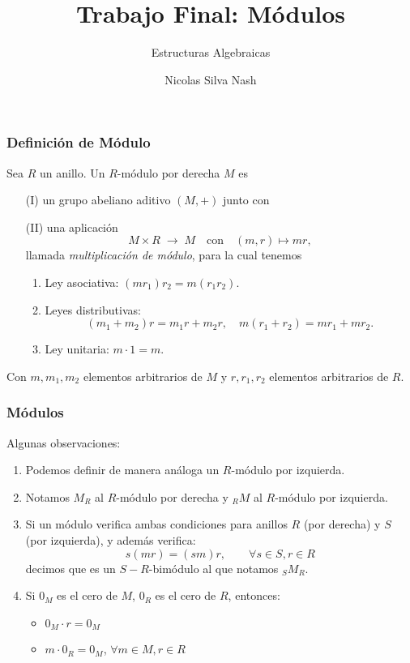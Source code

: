 \documentclass[notes=show]{beamer}%
\begin{document}
\title{Trabajo Final: Módulos}
\subtitle{Estructuras Algebraicas}
\author{Nicolas Silva Nash}
\date{}
\maketitle

\bigskip%
\begin{frame}
    \frametitle{Definición de Módulo}
    Sea \( R \) un anillo. Un \( R \)-módulo por derecha \( M \) es
    \begin{enumerate}
        \item[(I)] un grupo abeliano aditivo $(M, +)$ junto con
        \item[(II)] una aplicación
        \[
        M \times R \;\rightarrow\; M \quad \text{con} \quad (m, r) \mapsto mr,
        \]
        llamada \textit{multiplicación de módulo}, para la cual tenemos
        \begin{enumerate}
            \item Ley asociativa: \((mr_1)r_2 = m(r_1r_2)\).
            \item Leyes distributivas: 
            \[
            (m_1 + m_2)r = m_1r + m_2r, \quad m(r_1 + r_2) = mr_1 + mr_2.
            \]
            \item Ley unitaria: \( m \cdot 1 = m \).
        \end{enumerate}
    \end{enumerate}
    Con \( m, m_1, m_2 \) elementos arbitrarios de $M$ y \( r, r_1, r_2 \) elementos arbitrarios de $R$.
\end{frame}

\begin{frame}
    \frametitle{Módulos}
    Algunas observaciones:
    \begin{enumerate}
        \item Podemos definir de manera análoga un \( R \)-módulo por izquierda.
        \item Notamos \( M_R \) al \( R \)-módulo por derecha y \( _{R}M \) al \( R \)-módulo por izquierda.
        \item Si un módulo verifica ambas condiciones para anillos \( R \) (por derecha) y \( S \) (por izquierda), 
        y además verifica: 
        \[ s(mr) = (sm)r, \qquad \forall s \in S, r \in R \] 
        decimos que es un \( S-R \)-bimódulo al que notamos \( _{S}M_R \).
        \item Si \( 0_M \) es el cero de \( M \), \( 0_R \) es el cero de \( R \), entonces:
        \begin{itemize}
            \item \( 0_M \cdot r = 0_M \)
            \item \( m \cdot 0_R = 0_M \), \(\forall m \in M, r \in R \)
        \end{itemize}
    \end{enumerate}
\end{frame}
\end{document}
